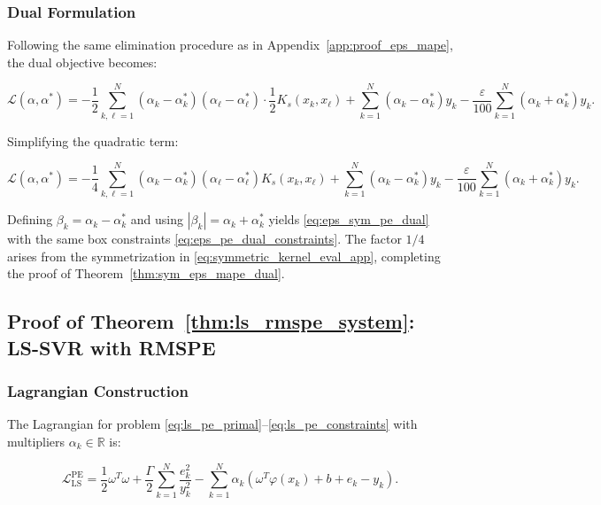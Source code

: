 \documentclass[mathematics,article,submit,pdftex,moreauthors]{Definitions/mdpi}
\begin{document}
\subsubsection{Dual Formulation}

Following the same elimination procedure as in Appendix~\ref{app:proof_eps_mape}, 
the dual objective becomes:
\begin{linenomath}
\begin{equation}
\mathcal{L}(\alpha, \alpha^*) = -\frac{1}{2}\sum_{k,\ell=1}^N (\alpha_k - \alpha_k^*)(\alpha_\ell - \alpha_\ell^*) \cdot \frac{1}{2}K_s(x_k, x_\ell)
+ \sum_{k=1}^N (\alpha_k - \alpha_k^*) y_k - \frac{\varepsilon}{100}\sum_{k=1}^N (\alpha_k + \alpha_k^*) y_k.
\end{equation}
\end{linenomath}

Simplifying the quadratic term:
\begin{linenomath}
\begin{equation}
\mathcal{L}(\alpha, \alpha^*) = -\frac{1}{4}\sum_{k,\ell=1}^N (\alpha_k - \alpha_k^*)(\alpha_\ell - \alpha_\ell^*) K_s(x_k, x_\ell)
+ \sum_{k=1}^N (\alpha_k - \alpha_k^*) y_k - \frac{\varepsilon}{100}\sum_{k=1}^N (\alpha_k + \alpha_k^*) y_k.
\end{equation}
\end{linenomath}

Defining $\beta_k = \alpha_k - \alpha_k^*$ and using $|\beta_k| = \alpha_k + \alpha_k^*$ yields 
\eqref{eq:eps_sym_pe_dual} with the same box constraints \eqref{eq:eps_pe_dual_constraints}. 
The factor $1/4$ arises from the symmetrization in \eqref{eq:symmetric_kernel_eval_app}, 
completing the proof of Theorem~\ref{thm:sym_eps_mape_dual}.


\subsection{Proof of Theorem~\ref{thm:ls_rmspe_system}: LS-SVR with RMSPE}
\label{app:proof_ls_rmspe}

\subsubsection{Lagrangian Construction}

The Lagrangian for problem \eqref{eq:ls_pe_primal}--\eqref{eq:ls_pe_constraints} 
with multipliers $\alpha_k \in \mathbb{R}$ is:
\begin{linenomath}
\begin{equation}\label{eq:lagrangian_ls_full}
\mathcal{L}_{\mathrm{LS}}^{\mathrm{PE}} 
= \frac{1}{2}\omega^T\omega + \frac{\Gamma}{2}\sum_{k=1}^N\frac{e_k^2}{y_k^2}
- \sum_{k=1}^N \alpha_k(\omega^T\varphi(x_k) + b + e_k - y_k).
\end{equation}
\end{linenomath}
\end{document}
